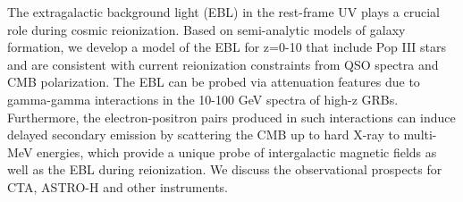 


\bigskip



\bigskip

\noindent The extragalactic background light (EBL) in the rest-frame UV plays a crucial role during cosmic reionization. Based on semi-analytic models of galaxy formation, we develop a model of the EBL for z=0-10 that include Pop III stars and are consistent with current reionization constraints from QSO spectra and CMB polarization. The EBL can be probed via attenuation features due to gamma-gamma interactions in the 10-100 GeV spectra of high-z GRBs. Furthermore, the electron-positron pairs produced in such interactions can induce delayed secondary emission by scattering the CMB up to hard X-ray to multi-MeV energies, which provide a unique probe of intergalactic magnetic fields as well as the EBL during reionization. We discuss the observational prospects for CTA, ASTRO-H and other instruments.

